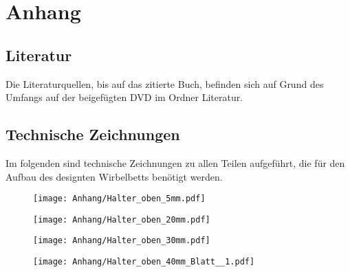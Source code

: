 {}

\listoffigures




{}










{}


\chapter*{Anhang}

\pagestyle{plain}

\section*{Literatur}

Die Literaturquellen, bis auf das zitierte Buch, befinden sich auf Grund des Umfangs auf der beigefügten DVD im Ordner \glqq Literatur\grqq .

\section*{Technische Zeichnungen}

Im folgenden sind technische Zeichnungen zu allen Teilen aufgeführt, die für den Aufbau des designten Wirbelbetts benötigt werden.



\captionsetup{listof=false}

\begin{figure}  
	\texttt{[image: Anhang/Halter\_oben\_5mm.pdf]}
\end{figure}

\begin{figure}  
	\texttt{[image: Anhang/Halter\_oben\_20mm.pdf]}
\end{figure}

\begin{figure}  
	\texttt{[image: Anhang/Halter\_oben\_30mm.pdf]}
\end{figure}

\begin{figure}  
	\texttt{[image: Anhang/Halter\_oben\_40mm\_Blatt\_\_1.pdf]}
\end{figure}


